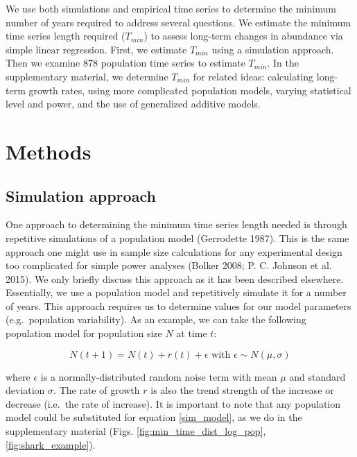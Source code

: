 \documentclass[12pt,]{article}
\begin{document}
We use both simulations and empirical time series to determine the
minimum number of years required to address several questions. We
estimate the minimum time series length required (\(T_{min}\)) to assess
long-term changes in abundance via simple linear regression. First, we
estimate \(T_{min}\) using a simulation approach. Then we examine 878
population time series to estimate \(T_{min}\). In the supplementary
material, we determine \(T_{min}\) for related ideas: calculating
long-term growth rates, using more complicated population models,
varying statistical level and power, and the use of generalized additive
models.

\section{Methods}\label{methods}

\subsection{Simulation approach}\label{simulation-approach}

One approach to determining the minimum time series length needed is
through repetitive simulations of a population model (Gerrodette 1987).
This is the same approach one might use in sample size calculations for
any experimental design too complicated for simple power analyses
(Bolker 2008; P. C. Johnson et al. 2015). We only briefly discuss this
approach as it has been described elsewhere. Essentially, we use a
population model and repetitively simulate it for a number of years.
This approach requires us to determine values for our model parameters
(e.g.~population variability). As an example, we can take the following
population model for population size \(N\) at time \(t\):

\begin{equation}
N(t + 1) = N(t) + r(t) + \epsilon \mbox{ with } \epsilon \sim N(\mu, \sigma)
\label{sim_model}
\end{equation}

where \(\epsilon\) is a normally-distributed random noise term with mean
\(\mu\) and standard deviation \(\sigma\). The rate of growth \(r\) is
also the trend strength of the increase or decrease (i.e.~the rate of
increase). It is important to note that any population model could be
substituted for equation \ref{sim_model}, as we do in the supplementary
material (Figs. \ref{fig:min_time_dist_log_pop},
\ref{fig:shark_example}).
\end{document}
